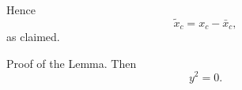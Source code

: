 \documentclass{autart}
\begin{document}
\begin{pf}
Hence
$$
\tilde x_c = x_c - \bar x_c,
$$
as claimed.
\end{pf}
\begin{pf*}{Proof of the Lemma.}
Then $$y^2 = 0.$$
\end{pf*}
\end{document}

